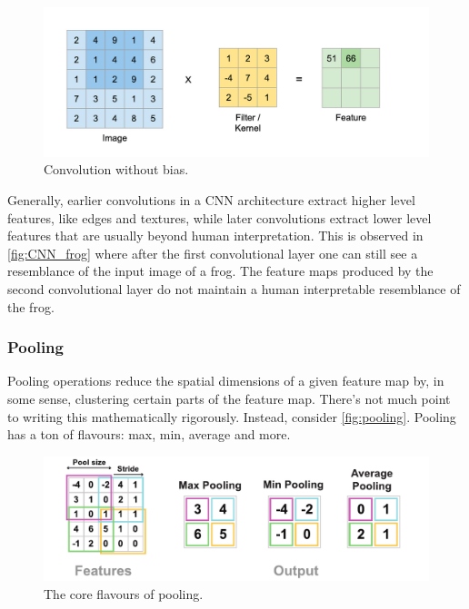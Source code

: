 \documentclass[11pt]{article}
\begin{document}
\begin{figure}[ht]
    \centering
    \includegraphics[width=1\textwidth]{./figures/neural_nets/CNN_convolution.png}
    \caption{\centering Convolution without bias.}
    \label{fig:convolution_operation}
\end{figure}

\noindent Generally, earlier convolutions in a CNN architecture extract higher level features, like edges and textures, while later convolutions extract lower level features that are usually beyond human interpretation. This is observed in \autoref{fig:CNN_frog} where after the first convolutional layer one can still see a resemblance of the input image of a frog. The feature maps produced by the second convolutional layer do not maintain a human interpretable resemblance of the frog.

\subsubsection{Pooling}
Pooling operations reduce the spatial dimensions of a given feature map by, in some sense, clustering certain parts of the feature map. There's not much point to writing this mathematically rigorously. Instead, consider \autoref{fig:pooling}. Pooling has a ton of flavours: max, min, average and more.

\begin{figure}[ht]
    \centering
    \includegraphics[width=1\textwidth]{./figures/neural_nets/CNN_pooling.pdf}
    \caption{\centering The core flavours of pooling.}
    \label{fig:pooling}
\end{figure}
\end{document}
